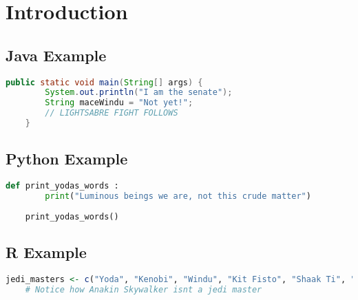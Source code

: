 \documentclass[12pt]{article}
\begin{document}





\formattingForRestOfReport
\section{Introduction}
\subsection{Java Example}
\begin{lstlisting}[language = Java]
	public static void main(String[] args) {
		System.out.println("I am the senate");
		String maceWindu = "Not yet!";
		// LIGHTSABRE FIGHT FOLLOWS
	}
\end{lstlisting}

\subsection{Python Example}
\begin{lstlisting}[language = Python]
	def print_yodas_words :
		print("Luminous beings we are, not this crude matter")
		
	print_yodas_words()
\end{lstlisting}

\subsection{R Example}
\begin{lstlisting}[language = R]
	jedi_masters <- c("Yoda", "Kenobi", "Windu", "Kit Fisto", "Shaak Ti", "Qui-Gon")
	# Notice how Anakin Skywalker isnt a jedi master
\end{lstlisting}



\end{document}
